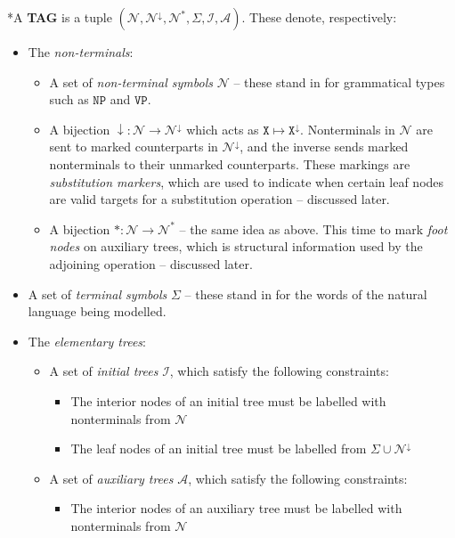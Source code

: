 \begin{fullwidth}
\begin{defn}
*A \textbf{TAG} is a tuple $(\mathcal{N}, \mathcal{N}^\downarrow, \mathcal{N}^*, \Sigma, \mathcal{I}, \mathcal{A})$. These denote, respectively:
\begin{itemize}
	\item{ The \emph{non-terminals}:
		\begin{itemize}
			\item{A set of \emph{non-terminal symbols} $\mathcal{N}$ -- these stand in for grammatical types such as $\texttt{NP}$ and $\texttt{VP}$.}
			\item{A bijection $\downarrow: \mathcal{N} \rightarrow \mathcal{N}^\downarrow$ which acts as $\texttt{X} \mapsto \texttt{X}^\downarrow$. Nonterminals in $\mathcal{N}$ are sent to marked counterparts in $\mathcal{N}^\downarrow$, and the inverse sends marked nonterminals to their unmarked counterparts. These markings are \emph{substitution markers}, which are used to indicate when certain leaf nodes are valid targets for a substitution operation -- discussed later.}
			\item{A bijection $*: \mathcal{N} \rightarrow \mathcal{N}^*$ -- the same idea as above. This time to mark \emph{foot nodes} on auxiliary trees, which is structural information used by the adjoining operation -- discussed later.}
	\end{itemize}
	}
	\item{A set of \emph{terminal symbols} $\Sigma$ -- these stand in for the words of the natural language being modelled.}
	\item{The \emph{elementary trees}:
		\begin{itemize}
			\item{A set of \emph{initial trees} $\mathcal{I}$, which satisfy the following constraints:
			\begin{itemize}
				\item{The interior nodes of an initial tree must be labelled with nonterminals from $\mathcal{N}$}
				\item{The leaf nodes of an initial tree must be labelled from $\Sigma \cup \mathcal{N}^{\downarrow}$}
			\end{itemize}
			}
	\item{A set of \emph{auxiliary trees} $\mathcal{A}$, which satisfy the following constraints:
		\begin{itemize}
			\item{The interior nodes of an auxiliary tree must be labelled with nonterminals from $\mathcal{N}$}

\end{itemize}}
\end{itemize}}
\end{itemize}
\end{defn}
\end{fullwidth}
